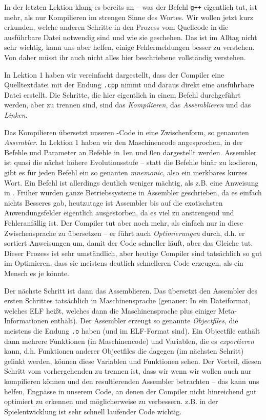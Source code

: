 
In der letzten Lektion klang es bereits an -- was der Befehl \texttt{g++}
eigentlich tut, ist mehr, als nur Kompilieren im strengen Sinne des Wortes. Wir
wollen jetzt kurz erkunden, welche anderen Schritte in den Prozess vom
Quellcode in die ausführbare Datei notwendig sind und wie sie geschehen. Das
ist im Alltag nicht sehr wichtig, kann uns aber helfen, einige Fehlermeldungen
besser zu verstehen. Von daher müsst ihr auch nicht alles hier beschriebene
vollständig verstehen.

In Lektion 1 haben wir vereinfacht dargestellt, dass der Compiler eine
Quelltextdatei mit der Endung \texttt{.cpp} nimmt und daraus direkt eine
ausführbare Datei erstellt. Die Schritte, die hier eigentlich in einem Befehl
durchgeführt werden, aber zu trennen sind, sind das \emph{Kompilieren}, das
\emph{Assemblieren} und das \emph{Linken}.

Das Kompilieren übersetzt unseren \Cpp-Code in eine Zwischenform, so genannten
\emph{Assembler}. In Lektion 1 haben wir den Maschinencode angesprochen, in der
Befehle und Parameter an Befehle in 1en und 0en dargestellt werden. Assembler
ist quasi die nächst höhere Evolutionsstufe -- statt die Befehle binär zu
kodieren, gibt es für jeden Befehl ein so genanten \emph{mnemonic}, also ein
merkbares kurzes Wort. Ein Befehl ist allerdings deutlich weniger mächtig, als
z.B. eine Anweisung in \Cpp. Früher wurden ganze Betriebssysteme in Assembler
geschrieben, da es einfach nichts Besseres gab, heutzutage ist Assembler bis
auf die exotischsten Anwendungsfelder eigentlich ausgestorben, da es viel zu
anstrengend und Fehleranfällig ist. Der Compiler tut aber noch mehr, als
einfach nur in diese Zwischensprache zu übersetzen -- er führt auch
\emph{Optimierungen} durch, d.h. er sortiert Anweisungen um, damit der Code
schneller läuft, aber das Gleiche tut. Dieser Prozess ist sehr umständlich,
aber heutige Compiler sind tatsächlich so gut im Optimieren, dass sie meistens
deutlich schnelleren Code erzeugen, als ein Mensch es je könnte.

Der nächste Schritt ist dann das Assemblieren. Das übersetzt den Assembler des
ersten Schrittes tatsächlich in Maschinensprache (genauer: In ein Dateiformat,
welches ELF heißt, welches dann die Maschinensprache plus einiger
Meta-Informationen enthält). Der Assembler erzeugt so genannte
\emph{Objectfiles}, die meistens die Endung \texttt{.o} haben (und im
ELF-Format sind). Ein Objectfile enthält dann mehrere Funktionen (in
Maschinencode) und Variablen, die es \emph{exportieren} kann, d.h. Funktionen
anderer Objectfiles die dagegen (im nächsten Schritt) gelinkt werden, können
diese Variablen und Funktionen sehen. Der Vorteil, diesen Schritt vom
vorhergehenden zu trennen ist, dass wir wenn wir wollen auch nur kompilieren
können und den resultierenden Assembler betrachten -- das kann uns helfen,
Engpässe in unserem Code, an denen der Compiler nicht hinreichend gut optimiert
zu erkennen und möglicherweise zu verbessern. z.B. in der Spielentwicklung ist
sehr schnell laufender Code wichtig.

